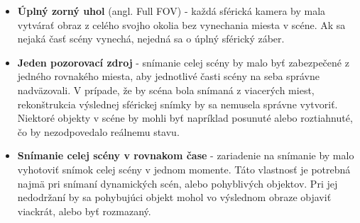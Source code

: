 \documentclass[slovak,master,dept460,male,cpp,cpdeclaration]{diploma}
\begin{document}
\begin{itemize}
\item \textbf{Úplný zorný uhol} (angl. Full FOV) - každá sférická kamera by mala vytvárať obraz z celého svojho okolia bez vynechania miesta v scéne. Ak sa nejaká časť scény vynechá, nejedná sa o úplný sférický záber.
\item \textbf{Jeden pozorovací zdroj} - snímanie celej scény by malo  byť zabezpečené z jedného rovnakého miesta, aby jednotlivé časti scény na seba správne nadväzovali. V prípade, že by scéna bola snímaná z viacerých miest, rekonštrukcia výslednej sférickej snímky  by sa nemusela správne vytvoriť. Niektoré objekty v scéne by mohli byť napríklad posunuté alebo roztiahnuté, čo by nezodpovedalo reálnemu stavu.
\item \textbf{Snímanie celej scény v rovnakom čase} - zariadenie na snímanie by malo vyhotoviť snímok celej scény v jednom momente. Táto vlastnosť je potrebná najmä pri snímaní dynamických scén, alebo pohyblivých objektov. Pri jej nedodržaní by sa pohybujúci objekt mohol vo výslednom obraze objaviť viackrát, alebo byť rozmazaný.
\end{itemize}
\end{document}
